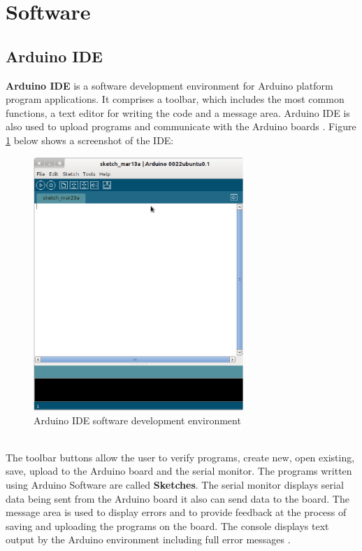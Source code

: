\documentclass[12pt,a4paper,draft]{report}
\begin{document}
\section{Software}
\subsection{Arduino IDE}
\textbf{Arduino IDE} is a software development environment for Arduino platform program applications.
It comprises a toolbar, which includes the most common functions, a text editor for writing the code and a message area.
Arduino IDE is also used to upload programs and communicate with the Arduino boards \cite{website:arduinosoftware}.
Figure \ref{fig:ArduinoIDE} below shows a screenshot of the IDE:
\begin{figure}[H]
    \centering
    \includegraphics*[width=300px]{arduinomain}
    \caption{Arduino IDE software development environment}
    \label{fig:ArduinoIDE}
\end{figure}
\ \\
The toolbar buttons allow the user to verify programs, create new, open existing, save, upload to the Arduino board and the serial monitor. The programs written using Arduino Software are called \textbf{Sketches}. The serial monitor displays serial data being sent from the Arduino board it also can send data to the board. The message area is used to display errors and to provide feedback at the process of saving and uploading the programs on the board. The console displays text output by the Arduino environment including full error messages \cite{website:arduinosoftware}.\\
\ \\
\end{document}
